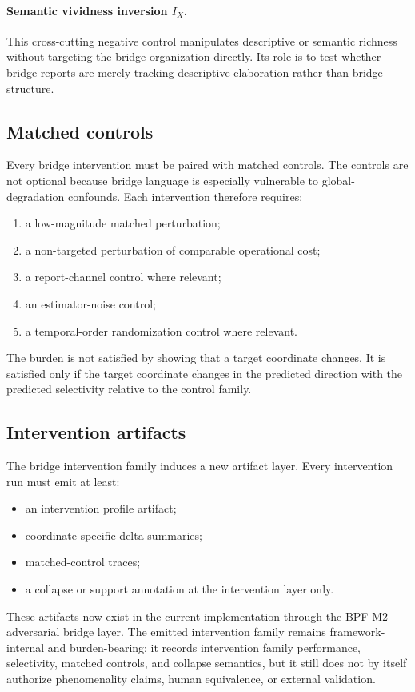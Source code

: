 \documentclass[11pt,a4paper]{article}
\theoremstyle{definition}
\begin{document}
\paragraph{Semantic vividness inversion $I_X$.}
This cross-cutting negative control manipulates descriptive or semantic richness without targeting the bridge organization directly. Its role is to test whether bridge reports are merely tracking descriptive elaboration rather than bridge structure.

\subsection{Matched controls}
Every bridge intervention must be paired with matched controls. The controls are not optional because bridge language is especially vulnerable to global-degradation confounds. Each intervention therefore requires:
\begin{enumerate}[leftmargin=1.5em]
\item a low-magnitude matched perturbation;
\item a non-targeted perturbation of comparable operational cost;
\item a report-channel control where relevant;
\item an estimator-noise control;
\item a temporal-order randomization control where relevant.
\end{enumerate}
The burden is not satisfied by showing that a target coordinate changes. It is satisfied only if the target coordinate changes in the predicted direction with the predicted selectivity relative to the control family.

\subsection{Intervention artifacts}
The bridge intervention family induces a new artifact layer. Every intervention run must emit at least:
\begin{itemize}[leftmargin=1.5em]
\item an intervention profile artifact;
\item coordinate-specific delta summaries;
\item matched-control traces;
\item a collapse or support annotation at the intervention layer only.
\end{itemize}
These artifacts now exist in the current implementation through the BPF-M2 adversarial bridge layer. The emitted intervention family remains framework-internal and burden-bearing: it records intervention family performance, selectivity, matched controls, and collapse semantics, but it still does not by itself authorize phenomenality claims, human equivalence, or external validation.
\end{document}
